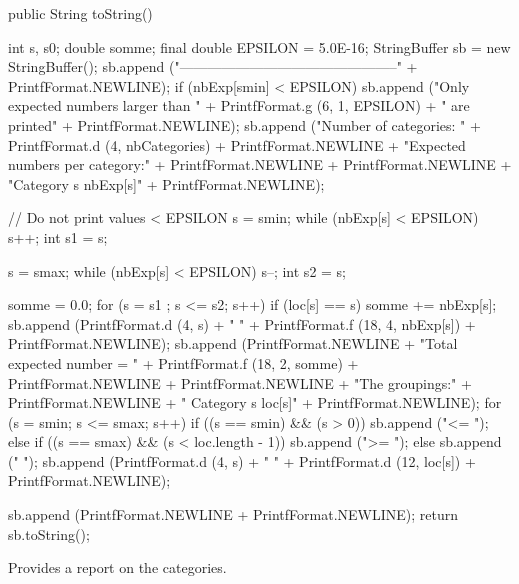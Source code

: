 \begin{code}

      public String toString()\begin{hide} {
         int s, s0;
         double somme;
         final double EPSILON = 5.0E-16;
         StringBuffer sb = new StringBuffer();
         sb.append ("-----------------------------------------------" +
                     PrintfFormat.NEWLINE);
         if (nbExp[smin] < EPSILON)
            sb.append ("Only expected numbers larger than " +
                       PrintfFormat.g (6, 1, EPSILON) + "  are printed" +
                                       PrintfFormat.NEWLINE);
         sb.append ("Number of categories: " +
               PrintfFormat.d (4, nbCategories) + PrintfFormat.NEWLINE +
               "Expected numbers per category:" + PrintfFormat.NEWLINE +
                PrintfFormat.NEWLINE + "Category s      nbExp[s]" +
                PrintfFormat.NEWLINE);

         // Do not print values < EPSILON
         s = smin;
         while (nbExp[s] < EPSILON)
            s++;
         int s1 = s;

         s = smax;
         while (nbExp[s] < EPSILON)
            s--;
         int s2 = s;

         somme = 0.0;
         for (s = s1 ; s <= s2; s++)
            if (loc[s] == s) {
               somme += nbExp[s];
               sb.append (PrintfFormat.d (4, s) + " " +
                          PrintfFormat.f (18, 4, nbExp[s]) +
                          PrintfFormat.NEWLINE);
            }
         sb.append (PrintfFormat.NEWLINE + "Total expected number = " +
                    PrintfFormat.f (18, 2, somme) + PrintfFormat.NEWLINE +
                    PrintfFormat.NEWLINE +
                    "The groupings:" + PrintfFormat.NEWLINE +
                    " Category s      loc[s]" + PrintfFormat.NEWLINE);
         for (s = smin; s <= smax; s++) {
            if ((s == smin) && (s > 0))
               sb.append ("<= ");
            else if ((s == smax) && (s < loc.length - 1))
               sb.append (">= ");
            else
               sb.append ("   ");
            sb.append (PrintfFormat.d (4, s) + " " +
                       PrintfFormat.d (12, loc[s]) + PrintfFormat.NEWLINE);
         }

         sb.append (PrintfFormat.NEWLINE + PrintfFormat.NEWLINE);
         return sb.toString();
      }\end{hide}
\end{code}
    \begin{tabbb}  Provides a report on the categories.
    \end{tabbb}
